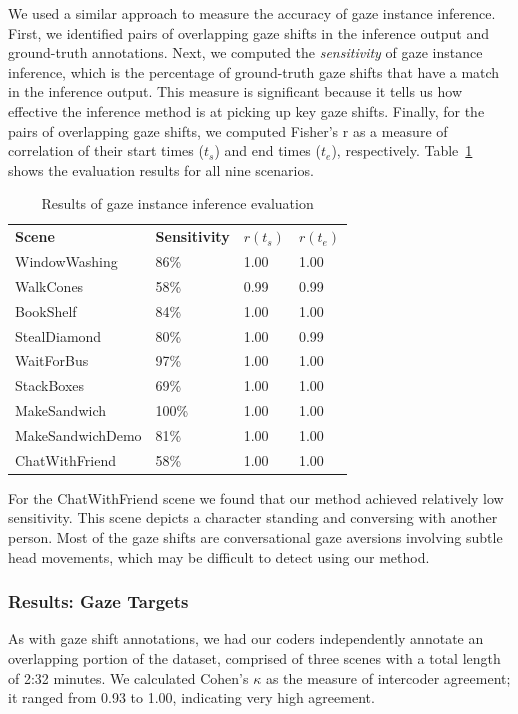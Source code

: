 We used a similar approach to measure the accuracy of gaze instance inference. First, we identified pairs of overlapping gaze shifts in the inference output and ground-truth annotations. Next, we computed the \emph{sensitivity} of gaze instance inference, which is the percentage of ground-truth gaze shifts that have a match in the inference output. This measure is significant because it tells us how effective the inference method is at picking up key gaze shifts. Finally, for the pairs of overlapping gaze shifts, we computed Fisher's r as a measure of correlation of their start times ($t_s$) and end times ($t_e$), respectively. Table~\ref{tab:GazeShiftInferenceResults} shows the evaluation results for all nine scenarios.

\begin{table}
\centering
\def\arraystretch{1.5}
\begin{tabular}{|l||l|l|l|}
\hline
\textbf{Scene} & \textbf{Sensitivity} & $r(t_s)$ & $r(t_e)$ \\
\Xhline{2\arrayrulewidth}
WindowWashing & 86\% & 1.00 & 1.00 \\
WalkCones & 58\% & 0.99 & 0.99 \\
BookShelf & 84\% & 1.00 & 1.00 \\
StealDiamond & 80\% & 1.00 & 0.99 \\
WaitForBus & 97\% & 1.00 & 1.00 \\
StackBoxes & 69\% & 1.00 & 1.00 \\
MakeSandwich & 100\% & 1.00 & 1.00 \\
MakeSandwichDemo & 81\% & 1.00 & 1.00 \\
ChatWithFriend & 58\% & 1.00 & 1.00 \\
\hline
\end{tabular}
\caption{Results of gaze instance inference evaluation}
\label{tab:GazeShiftInferenceResults}
\end{table}

For the ChatWithFriend scene we found that our method achieved relatively low sensitivity. This scene depicts a character standing and conversing with another person. Most of the gaze shifts are conversational gaze aversions involving subtle head movements, which may be difficult to detect using our method.

\subsubsection{Results: Gaze Targets}

As with gaze shift annotations, we had our coders independently annotate an overlapping portion of the dataset, comprised of three scenes with a total length of 2:32 minutes. We calculated Cohen's $\kappa$ as the measure of intercoder agreement; it ranged from 0.93 to 1.00, indicating very high agreement.

